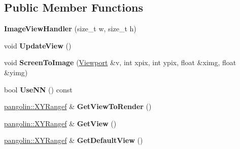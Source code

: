 \subsection*{Public Member Functions}
\begin{DoxyCompactItemize}
\item 
{\bfseries Image\+View\+Handler} (size\+\_\+t w, size\+\_\+t h)\hypertarget{classpangolin_1_1_image_view_handler_aa7f8cdfdaaade6428c2d276ce098689d}{}\label{classpangolin_1_1_image_view_handler_aa7f8cdfdaaade6428c2d276ce098689d}

\item 
void {\bfseries Update\+View} ()\hypertarget{classpangolin_1_1_image_view_handler_a71cd8786dfe1e10ef79f75ae9ced686a}{}\label{classpangolin_1_1_image_view_handler_a71cd8786dfe1e10ef79f75ae9ced686a}

\item 
void {\bfseries Screen\+To\+Image} (\hyperlink{structpangolin_1_1_viewport}{Viewport} \&v, int xpix, int ypix, float \&ximg, float \&yimg)\hypertarget{classpangolin_1_1_image_view_handler_ae9aa52388703ee348d663de84c8ef763}{}\label{classpangolin_1_1_image_view_handler_ae9aa52388703ee348d663de84c8ef763}

\item 
bool {\bfseries Use\+NN} () const \hypertarget{classpangolin_1_1_image_view_handler_a762ff523db161a2f04a6d29b84939b19}{}\label{classpangolin_1_1_image_view_handler_a762ff523db161a2f04a6d29b84939b19}

\item 
\hyperlink{structpangolin_1_1_x_y_range}{pangolin\+::\+X\+Y\+Rangef} \& {\bfseries Get\+View\+To\+Render} ()\hypertarget{classpangolin_1_1_image_view_handler_aa66b1586d22f202590d9cf0fdbd55703}{}\label{classpangolin_1_1_image_view_handler_aa66b1586d22f202590d9cf0fdbd55703}

\item 
\hyperlink{structpangolin_1_1_x_y_range}{pangolin\+::\+X\+Y\+Rangef} \& {\bfseries Get\+View} ()\hypertarget{classpangolin_1_1_image_view_handler_a982b562b314393f18f4b7ff52d62e240}{}\label{classpangolin_1_1_image_view_handler_a982b562b314393f18f4b7ff52d62e240}

\item 
\hyperlink{structpangolin_1_1_x_y_range}{pangolin\+::\+X\+Y\+Rangef} \& {\bfseries Get\+Default\+View} ()\hypertarget{classpangolin_1_1_image_view_handler_a1faf88703dafe3576bed8e866e6e471f}{}\label{classpangolin_1_1_image_view_handler_a1faf88703dafe3576bed8e866e6e471f}


\end{DoxyCompactItemize}
